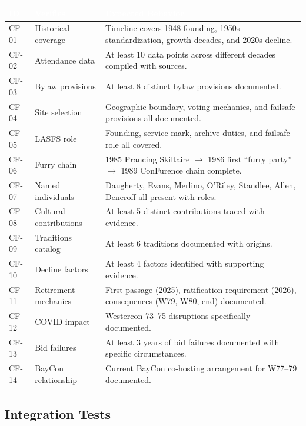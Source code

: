 \documentclass[11pt,letterpaper]{article}
\newcommand{\tableheader}[1]{\textbf{\sffamily\textcolor{white}{#1}}}
\begin{document}
\begin{center}
\begin{tabularx}{\textwidth}{C{1.2cm}L{3cm}X}
\toprule
{}
\tableheader{ID} & \tableheader{Verifies} & \tableheader{Expected Behavior} \\
\midrule
CF-01 & Historical coverage & Timeline covers 1948 founding, 1950s standardization, growth decades, and 2020s decline. \\
CF-02 & Attendance data & At least 10 data points across different decades compiled with sources. \\
CF-03 & Bylaw provisions & At least 8 distinct bylaw provisions documented. \\
CF-04 & Site selection & Geographic boundary, voting mechanics, and failsafe provisions all documented. \\
CF-05 & LASFS role & Founding, service mark, archive duties, and failsafe role all covered. \\
CF-06 & Furry chain & 1985 Prancing Skiltaire $\rightarrow$ 1986 first ``furry party'' $\rightarrow$ 1989 ConFurence chain complete. \\
CF-07 & Named individuals & Daugherty, Evans, Merlino, O'Riley, Standlee, Allen, Deneroff all present with roles. \\
CF-08 & Cultural contributions & At least 5 distinct contributions traced with evidence. \\
CF-09 & Traditions catalog & At least 6 traditions documented with origins. \\
CF-10 & Decline factors & At least 4 factors identified with supporting evidence. \\
CF-11 & Retirement mechanics & First passage (2025), ratification requirement (2026), consequences (W79, W80, end) documented. \\
CF-12 & COVID impact & Westercon 73--75 disruptions specifically documented. \\
CF-13 & Bid failures & At least 3 years of bid failures documented with specific circumstances. \\
CF-14 & BayCon relationship & Current BayCon co-hosting arrangement for W77--79 documented. \\
\bottomrule
\end{tabularx}
\end{center}

\subsection{Integration Tests}
\end{document}
